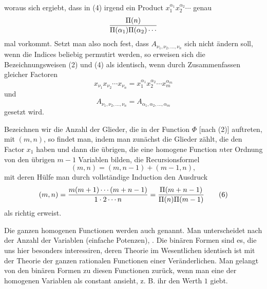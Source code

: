 
woraus sich ergiebt, dass in (4) irgend ein Product $x_1^{\alpha_1}x_2^{\alpha_2}\cdots$ genau
\[
 {\Pi(n)\over \Pi(\alpha_1)\Pi(\alpha_2)\cdots}
\]
mal vorkommt. Setzt man also noch fest, dass $A_{\nu_1,\nu_2,\ldots,\nu_n}$ sich nicht ändern soll, wenn die Indices beliebig permutirt werden, so erweisen sich die Bezeichnungsweisen (2) und (4) als identisch, wenn durch Zusammenfassen gleicher Factoren
\[
 x_{\nu_1}x_{\nu_2}\cdots x_{\nu_n}=x_1^{\alpha_1}x_2^{\alpha_2}\cdots x_m^{\alpha_m}
\]
und
\[
 A_{\nu_1,\nu_2,\ldots,\nu_n}=A_{\alpha_1,\alpha_2,\ldots,\alpha_m}
\]
gesetzt wird.

Bezeichnen wir die Anzahl der Glieder, die in der Function $\Phi$ [nach (2)] auftreten, mit $(m,n)$, so findet man, indem man zunächst die Glieder zählt, die den Factor $x_1$ haben und dann die übrigen, die eine homogene Function $n$ter Ordnung von den übrigen $m-1$ Variablen bilden, die Recursionsformel
\begin{equation}
 (m,n)=(m,n-1)+(m-1,n),
\tag{5}
\end{equation}
mit deren Hülfe man durch vollständige Induction den Ausdruck
\begin{equation}
 (m,n)={m(m+1)\cdots(m+n-1)\over 1\cdot2\cdots n}
 ={ \Pi(m+n-1)\over \Pi(n)\Pi(m-1)}
\tag{6}
\end{equation}
als richtig erweist.

Die ganzen homogenen Functionen werden auch  genannt. Man unterscheidet nach der Anzahl der Variablen  (einfache Potenzen), . Die binären Formen sind es, die uns hier besonders interessiren, deren Theorie im Wesentlichen identisch ist mit der Theorie der ganzen rationalen Functionen einer Veränderlichen. Man gelangt von den binären Formen zu diesen Functionen zurück, wenn man eine der homogenen Variablen als constant ansieht, z. B. ihr den Werth $1$ giebt.
